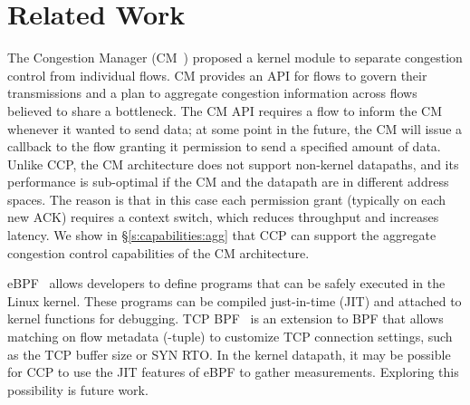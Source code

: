 \section{Related Work}
\label{s:relwork}
The Congestion Manager (CM~\cite{cm}) proposed a kernel module to separate congestion control from individual flows. CM provides an API for flows to govern their transmissions and a plan to aggregate congestion information across flows believed to share a bottleneck. The CM API requires a flow to inform the CM whenever it wanted to send data; at some point in the future, the CM will issue a callback to the flow granting it permission to send a specified amount of data. Unlike CCP, the CM architecture does not support non-kernel datapaths, and its performance is sub-optimal if the CM and the datapath are in different address spaces. The reason is that in this case each permission grant (typically on each new ACK) requires a context switch, which reduces throughput and increases latency. We show in \S\ref{s:capabilities:agg} that CCP can support the aggregate congestion control capabilities of the CM architecture.



eBPF~\cite{ebpf} allows developers to define programs that can be safely executed in the Linux kernel. These programs can be compiled just-in-time (JIT) and attached to kernel functions for debugging. TCP BPF~\cite{tcpbpf} is an extension to BPF that allows matching on flow metadata (-tuple) to customize TCP connection settings, such as the TCP buffer size or SYN RTO.
In the kernel datapath, it may be possible for CCP to use the JIT features of eBPF to gather measurements.
Exploring this possibility is future work.

